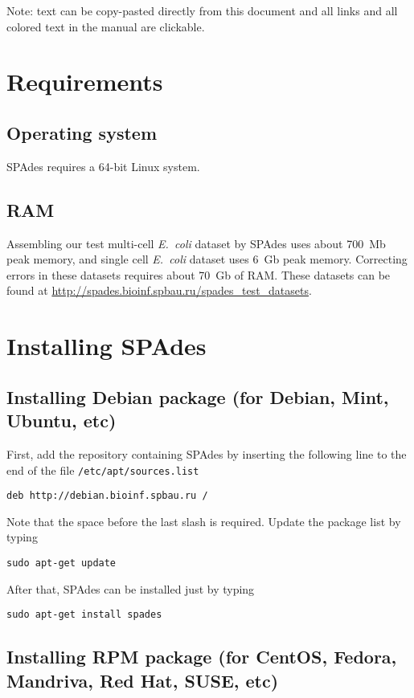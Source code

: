 \documentclass{article}
\def\spades{SPAdes}
\def\ecoli{\it E.~coli}
\begin{document}
Note: text can be copy-pasted directly from this document
and all links and all colored text in the manual are clickable.


\section{Requirements}
\subsection{Operating system}
{\spades} requires a 64-bit Linux system.

\subsection{RAM}
Assembling our test multi-cell {\ecoli} dataset 
by {\spades} uses about 700~Mb peak memory, and single cell
{\ecoli} dataset uses 6~Gb peak memory. 
Correcting errors in these datasets requires about 70~Gb of RAM.
These datasets can be found at \url{http://spades.bioinf.spbau.ru/spades_test_datasets}.

\section{Installing {\spades}}
\subsection{Installing Debian package (for Debian, Mint, Ubuntu, etc)}\label{subsec:deb_package}
First, add the repository containing {\spades} by inserting the following line
to the end of the file {\tt /etc/apt/sources.list}
\begin{lstlisting}
deb http://debian.bioinf.spbau.ru /
\end{lstlisting}
Note that the space before the last slash is required. 
Update the package list by typing
\begin{lstlisting}
sudo apt-get update
\end{lstlisting}
After that, {\spades} can be installed just by typing
\begin{lstlisting}
sudo apt-get install spades
\end{lstlisting}

\subsection{Installing RPM package (for CentOS, Fedora, Mandriva, Red Hat, SUSE, etc)}\label{subsec:rpm_package}
\end{document}
